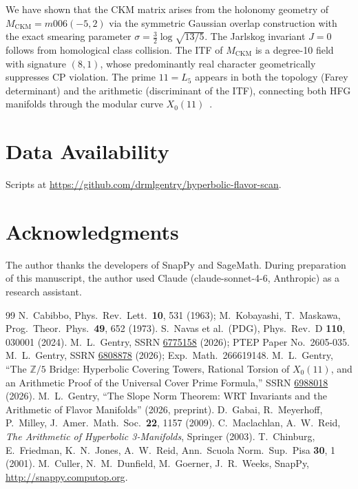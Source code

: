 \documentclass[11pt,a4paper]{article}
\theoremstyle{remark}
\newcommand{\MCKM}{M_{\mathrm{CKM}}}
\begin{document}
We have shown that the CKM matrix arises from the holonomy geometry
of $\MCKM = m006(-5,2)$ via the symmetric Gaussian overlap construction
with the exact smearing parameter $\sigma = \frac{3}{2}\log\sqrt{13/5}$.
The Jarlskog invariant $J=0$ follows from homological class collision.
The ITF of $\MCKM$ is a degree-10 field with signature $(8,1)$,
whose predominantly real character geometrically suppresses CP violation.
The prime $11 = L_5$ appears in both the topology (Farey determinant)
and the arithmetic (discriminant of the ITF), connecting both HFG
manifolds through the modular curve $X_0(11)$~\cite{Gentry:X011}.

\section*{Data Availability}
Scripts at \url{https://github.com/drmlgentry/hyperbolic-flavor-scan}.

\section*{Acknowledgments}
The author thanks the developers of SnapPy and SageMath.
During preparation of this manuscript, the author used Claude
(claude-sonnet-4-6, Anthropic) as a research assistant.

\begin{thebibliography}{99}
N.~Cabibbo, Phys.\ Rev.\ Lett.\ \textbf{10}, 531 (1963);
M.~Kobayashi, T.~Maskawa, Prog.\ Theor.\ Phys.\ \textbf{49}, 652 (1973).
S.~Navas et al.\ (PDG), Phys.\ Rev.\ D \textbf{110}, 030001 (2024).
M.~L.~Gentry, SSRN \href{https://doi.org/10.2139/ssrn.6775158}{6775158}
(2026); PTEP Paper No.\ 2605-035.
M.~L.~Gentry, SSRN \href{https://doi.org/10.2139/ssrn.6808878}{6808878}
(2026); Exp.\ Math.\ 266619148.
M.~L.~Gentry, ``The $\mathbb{Z}/5$ Bridge: Hyperbolic Covering Towers,
Rational Torsion of $X_0(11)$, and an Arithmetic Proof of the
Universal Cover Prime Formula,''
SSRN \href{https://doi.org/10.2139/ssrn.6988018}{6988018} (2026).
M.~L.~Gentry, ``The Slope Norm Theorem: WRT Invariants and the
Arithmetic of Flavor Manifolds'' (2026, preprint).
D.~Gabai, R.~Meyerhoff, P.~Milley,
J.\ Amer.\ Math.\ Soc.\ \textbf{22}, 1157 (2009).
C.~Maclachlan, A.~W.~Reid,
\emph{The Arithmetic of Hyperbolic 3-Manifolds}, Springer (2003).
T.~Chinburg, E.~Friedman, K.~N.~Jones, A.~W.~Reid,
Ann.\ Scuola Norm.\ Sup.\ Pisa \textbf{30}, 1 (2001).
M.~Culler, N.~M.~Dunfield, M.~Goerner, J.~R.~Weeks,
SnapPy, \url{http://snappy.computop.org}.
\end{thebibliography}
\end{document}

